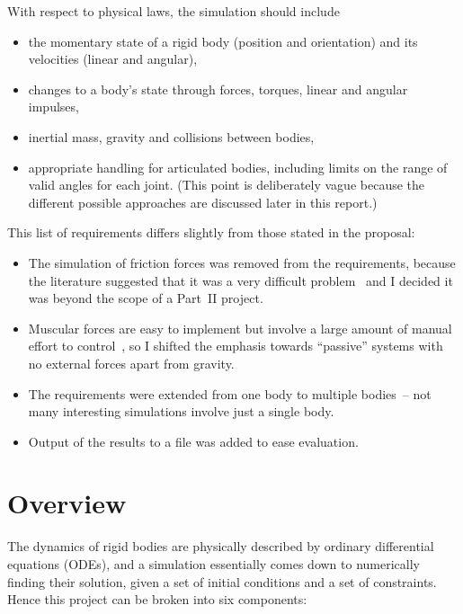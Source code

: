 With respect to physical laws, the simulation should include
\begin{itemize}
\item the momentary state of a rigid body (position and orientation) and its velocities (linear
    and angular),
\item changes to a body's state through forces, torques, linear and angular impulses,
\item inertial mass, gravity and collisions between bodies,
\item appropriate handling for articulated bodies, including limits on the range of valid angles
    for each joint. (This point is deliberately vague because the different possible approaches
    are discussed later in this report.)
\end{itemize}

This list of requirements differs slightly from those stated in the proposal:
\begin{itemize}
\item The simulation of friction forces was removed from the requirements, because the literature
    suggested that it was a very difficult problem~\cite{Baraff:PhD} and I decided it was beyond
    the scope of a Part~II project.
\item Muscular forces are easy to implement but involve a large amount of manual effort to
    control~\cite{Green:91}, so I shifted the emphasis towards ``passive'' systems with no
    external forces apart from gravity.
\item The requirements were extended from one body to multiple bodies~-- not many interesting
    simulations involve just a single body.
\item Output of the results to a file was added to ease evaluation.
\end{itemize}

\section{Overview}

The dynamics of rigid bodies are physically described by ordinary differential equations (ODEs),
and a simulation essentially comes down to numerically finding their solution, given a set of
initial conditions and a set of constraints. Hence this project can be broken into six components:

